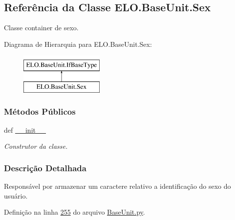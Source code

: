 \hypertarget{classELO_1_1BaseUnit_1_1Sex}{\subsection{Referência da Classe E\-L\-O.\-Base\-Unit.\-Sex}
\label{classELO_1_1BaseUnit_1_1Sex}
}


Classe container de sexo.  


Diagrama de Hierarquia para E\-L\-O.\-Base\-Unit.\-Sex\-:\begin{figure}[H]
\begin{center}
\leavevmode
\includegraphics[height=2.000000cm]{dd/d8a/classELO_1_1BaseUnit_1_1Sex}
\end{center}
\end{figure}
\subsubsection*{Métodos Públicos}
\begin{DoxyCompactItemize}
\item 
def \hyperlink{classELO_1_1BaseUnit_1_1Sex_a2a5214adaf2a657f70cd8cf579e420b5}{\-\_\-\-\_\-init\-\_\-\-\_\-}
\begin{DoxyCompactList}\small\item\em Construtor da classe. \end{DoxyCompactList}\end{DoxyCompactItemize}


\subsubsection{Descrição Detalhada}
Responsável por armazenar um caractere relativo a identificação do sexo do usuário. 

Definição na linha \hyperlink{BaseUnit_8py_source_l00255}{255} do arquivo \hyperlink{BaseUnit_8py_source}{Base\-Unit.\-py}.



